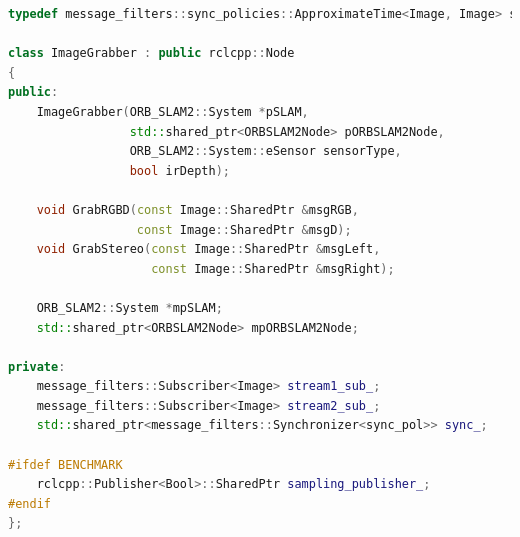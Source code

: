 \begin{lstlisting}[language=C++, caption={Definizione del nodo \emph{image\_grabber}.}, label={lst:imgrabber}]
typedef message_filters::sync_policies::ApproximateTime<Image, Image> sync_pol;

class ImageGrabber : public rclcpp::Node
{
public:
    ImageGrabber(ORB_SLAM2::System *pSLAM,
                 std::shared_ptr<ORBSLAM2Node> pORBSLAM2Node,
                 ORB_SLAM2::System::eSensor sensorType,
                 bool irDepth);

    void GrabRGBD(const Image::SharedPtr &msgRGB,
                  const Image::SharedPtr &msgD);
    void GrabStereo(const Image::SharedPtr &msgLeft,
                    const Image::SharedPtr &msgRight);

    ORB_SLAM2::System *mpSLAM;
    std::shared_ptr<ORBSLAM2Node> mpORBSLAM2Node;

private:
    message_filters::Subscriber<Image> stream1_sub_;
    message_filters::Subscriber<Image> stream2_sub_;
    std::shared_ptr<message_filters::Synchronizer<sync_pol>> sync_;

#ifdef BENCHMARK
    rclcpp::Publisher<Bool>::SharedPtr sampling_publisher_;
#endif
};
\end{lstlisting}


